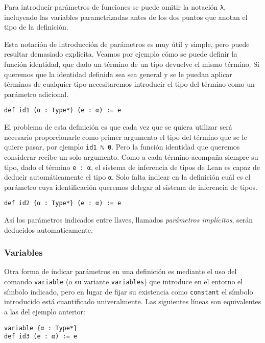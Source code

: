 Para introducir parámetros de funciones se puede omitir la notación
\lstinline{λ}, incluyendo las variables parametrizadas antes de los dos puntos
que anotan el tipo de la definición.

Esta notación de introducción de parámetros es muy útil y simple, pero puede
resultar demasiado explícita. Veamos por ejemplo cómo se puede definir la
función identidad, que dado un término de un tipo devuelve el mismo término.
Si queremos que la identidad definida sea sea general y se le puedan aplicar términos
de cualquier tipo necesitaremos introducir el tipo del término como un parámetro
adicional.

\begin{lstlisting}
def id1 (α : Type*) (e : α) := e
\end{lstlisting}

El problema de esta definición es que cada vez que se quiera utilizar será
necesario proporcionarle como primer argumento el tipo del término que se le
quiere pasar, por ejemplo \lstinline{id1 ℕ 0}.
Pero la función identidad que queremos considerar recibe un solo argumento.
Como a cada término acompaña siempre su tipo, dado el término \lstinline{e : α},
el sistema de inferencia de tipos de Lean es capaz de deducir automáticamente el
tipo \lstinline{α}. Solo falta indicar en la definición cuál es el parámetro
cuya identificación queremos delegar al sistema de inferencia de tipos.

\begin{lstlisting}
def id2 {α : Type*} (e : α) := e
\end{lstlisting}

Así los parámetros indicados entre llaves, llamados \textit{parámetros
	implícitos}, serán deducidos automaticamente.

\subsubsection*{Variables}%

Otra forma de indicar parámetros en una definición es mediante el uso del
comando \lstinline{variable} (o su variante \lstinline{variables}) que introduce
en el entorno el símbolo indicado, pero en lugar de fijar su existencia como
\lstinline{constant} el símbolo introducido está \guillemotleft cuantificado
univeralmente\guillemotright. Las siguientes líneas son equivalentes a las del
ejemplo anterior:

\begin{lstlisting}
variable {α : Type*}
def id3 (e : α) := e
\end{lstlisting}

